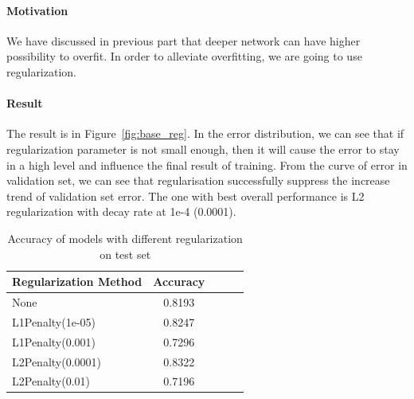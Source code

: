 \documentclass{article}
\begin{document}
\paragraph{Motivation} We have discussed in previous part that deeper network can have higher possibility to overfit. In order to alleviate overfitting, we are going to use regularization.

\paragraph{Result}
The result is in Figure~\ref{fig:base_reg}. In the error distribution, we can see that if regularization parameter is not small enough, then it will cause the error to stay in a high level and influence the final result of training.  From the curve of error in validation set, we can see that regularisation successfully suppress the increase trend of validation set error. The one with best overall performance is L2 regularization with decay rate at 1e-4 (0.0001).


\begin{table}[tb]
\vskip 3mm
\begin{center}
\begin{small}
\begin{sc}
\begin{tabular}{lcccr}
\hline
\abovespace\belowspace
Regularization Method & Accuracy \\
\hline
\abovespace
None					& 0.8193		\\
L1Penalty(1e-05)    	& 0.8247 	\\
L1Penalty(0.001)	 	& 0.7296 	\\
L2Penalty(0.0001)		& 0.8322  	\\
L2Penalty(0.01)	  		& 0.7196 	\\


\hline
\end{tabular}
\end{sc}
\end{small}
\caption{Accuracy of models with different regularization on test set}
\label{tab:reg}
\end{center}
\vskip -3mm
\end{table}
\end{document}
